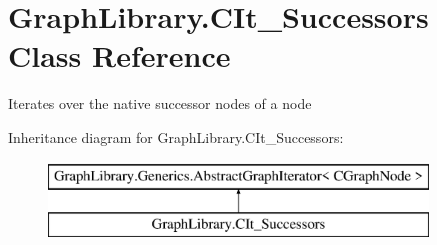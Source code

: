 \hypertarget{class_graph_library_1_1_c_it___successors}{}\section{Graph\+Library.\+C\+It\+\_\+\+Successors Class Reference}
\label{class_graph_library_1_1_c_it___successors}


Iterates over the native successor nodes of a node  


Inheritance diagram for Graph\+Library.\+C\+It\+\_\+\+Successors\+:\begin{figure}[H]
\begin{center}
\leavevmode
\includegraphics[height=2.000000cm]{class_graph_library_1_1_c_it___successors}
\end{center}
\end{figure}
